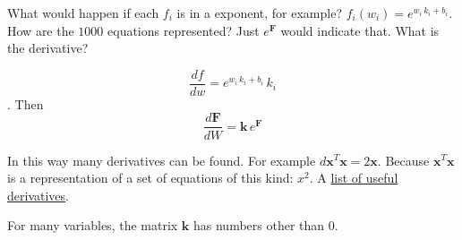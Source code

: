 What would happen if each $f_i$ is in a exponent, for example? $f_i(w_i) =  e^{w_i\,k_i + b_i}$. How are the $1000$ equations represented? Just $e^\mathbf{F}$ would indicate that. What is the derivative?

\begin{equation*}\frac{df}{dw} = e^{w_i\,k_i + b_i}\, k_i\end{equation*}. Then $$\frac{d\mathbf{F}}{dW}= \mathbf{k} \, e^\mathbf{F}$$

  In this way many derivatives can be found. For example $d\mathbf{x}^T\mathbf{x} = 2 \mathbf{x}$. Because $\mathbf{x}^T\mathbf{x}$ is a representation of a set of equations of this kind: $x^2$. A \href{https://www.gatsby.ucl.ac.uk/teaching/courses/sntn/sntn-2017/resources/Matrix_derivatives_cribsheet.pdf}{list of useful derivatives}.

For many variables, the matrix $\mathbf{k}$ has numbers other than $0$.
